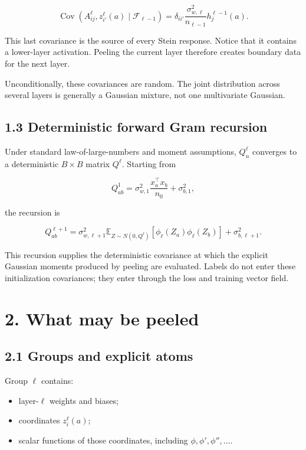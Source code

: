 \[
\operatorname{Cov}
\left(A^\ell_{ij},z_{i'}^\ell(a)
\mid\mathcal F_{\ell-1}\right)
=
\delta_{ii'}
\frac{\sigma_{w,\ell}^2}{n_{\ell-1}}
h_j^{\ell-1}(a).
\]


This last covariance is the source of every Stein response. Notice that it
contains a lower-layer activation. Peeling the current layer therefore creates
boundary data for the next layer.

Unconditionally, these covariances are random. The joint distribution across
several layers is generally a Gaussian mixture, not one multivariate Gaussian.

\subsection*{1.3 Deterministic forward Gram recursion}


Under standard law-of-large-numbers and moment assumptions,
\(Q^\ell_n\) converges to a deterministic \(B\times B\) matrix \(Q^\ell\).
Starting from

\[
Q^1_{ab}
=
\sigma_{w,1}^2\frac{x_a^\top x_b}{n_0}
+\sigma_{b,1}^2,
\]


the recursion is

\[
Q^{\ell+1}_{ab}
=
\sigma_{w,\ell+1}^2
\mathbb E_{Z\sim N(0,Q^\ell)}
\left[\phi_\ell(Z_a)\phi_\ell(Z_b)\right]
+\sigma_{b,\ell+1}^2.
\]


This recursion supplies the deterministic covariance at which the explicit
Gaussian moments produced by peeling are evaluated. Labels do not enter these
initialization covariances; they enter through the loss and training vector
field.

\section*{2. What may be peeled}


\subsection*{2.1 Groups and explicit atoms}


Group \(\ell\) contains:

\begin{itemize}
\item layer-\(\ell\) weights and biases;
\item coordinates \(z_i^\ell(a)\);
\item scalar functions of those coordinates, including
  \(\phi,\phi',\phi'',\ldots\).
\end{itemize}



